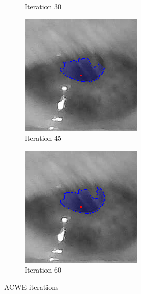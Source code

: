 \begin{figure}[h]
\begin{subfigure}{0.3\textwidth}
        \caption{Iteration 30}
    \end{subfigure}
    \hfill
    \begin{subfigure}{0.3\textwidth}
        \centering
        \includegraphics[width=0.9\linewidth]{plots/acwe/iteration_45.png}
        \caption{Iteration 45}
    \end{subfigure}
    \hfill
    \begin{subfigure}{0.3\textwidth}
        \centering
        \includegraphics[width=0.9\linewidth]{plots/acwe/iteration_60.png}
        \caption{Iteration 60}
    \end{subfigure}
    \caption{ACWE iterations}
    \label{fig:iterations_acwe}
\end{figure}

